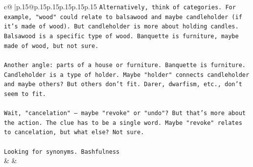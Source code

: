 \documentclass{article}
\begin{document}
{\begin{supertabular}{c@{$\;$}|p{.15\linewidth}@{}p{.15\linewidth}p{.15\linewidth}p{.15\linewidth}p{.15\linewidth}p{.15\linewidth}}
{{{\texttt{Alternatively, think of categories. For example, "wood" could relate to balsawood and maybe candleholder (if it's made of wood). But candleholder is more about holding candles. Balsawood is a specific type of wood. Banquette is furniture, maybe made of wood, but not sure.} \\
\\ 
\texttt{Another angle: parts of a house or furniture. Banquette is furniture. Candleholder is a type of holder. Maybe "holder" connects candleholder and maybe others? But others don't fit. Darer, dwarfism, etc., don't seem to fit.} \\
\\ 
\texttt{Wait, "cancelation" – maybe "revoke" or "undo"? But that's more about the action. The clue has to be a single word. Maybe "revoke" relates to cancelation, but what else? Not sure.} \\
\\ 
\texttt{Looking for synonyms. Bashfulness} \\
            }
        }
    }
    & & \\ \\


\end{supertabular}}
\end{document}
